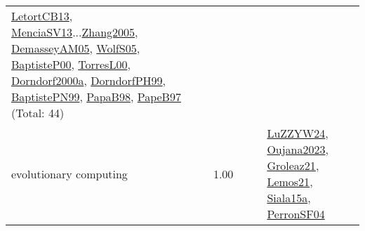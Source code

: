 {\begin{longtable}{p{3cm}r>{\raggedright\arraybackslash}p{6cm}>{\raggedright\arraybackslash}p{6cm}>{\raggedright\arraybackslash}p{8cm}}
\hyperref[detail:LetortCB13]{LetortCB13}, \hyperref[detail:MenciaSV13]{MenciaSV13}...\hyperref[detail:Zhang2005]{Zhang2005}, \hyperref[detail:DemasseyAM05]{DemasseyAM05}, \hyperref[detail:WolfS05]{WolfS05}, \hyperref[detail:BaptisteP00]{BaptisteP00}, \hyperref[detail:TorresL00]{TorresL00}, \hyperref[detail:Dorndorf2000a]{Dorndorf2000a}, \hyperref[detail:DorndorfPH99]{DorndorfPH99}, \hyperref[detail:BaptistePN99]{BaptistePN99}, \hyperref[detail:PapaB98]{PapaB98}, \hyperref[detail:PapeB97]{PapeB97} (Total: 44)\\
\index{evolutionary computing}\index{Algorithms!evolutionary computing}evolutionary computing &  1.00 &  &  & \hyperref[detail:LuZZYW24]{LuZZYW24}, \hyperref[detail:Oujana2023]{Oujana2023}, \hyperref[detail:Groleaz21]{Groleaz21}, \hyperref[detail:Lemos21]{Lemos21}, \hyperref[detail:Siala15a]{Siala15a}, \hyperref[detail:PerronSF04]{PerronSF04}\\

\end{longtable}}
